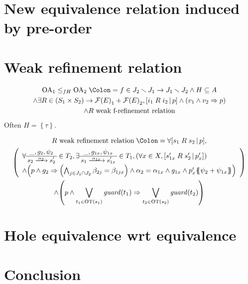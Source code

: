 \documentclass{article}
\theoremstyle{plain}
\theoremstyle{definition}
\newcommand\mpar[1]{{\left(#1\right)}}
\newcommand\mbrk[1]{{\left[#1\right]}}
\newcommand\mbrc[1]{{\left\{#1\right\}}}
\newcommand\psubst[1]{\mbrc{\!\!\mbrc{#1}\!\!}}
\newcommand\midbar{\,\middle|\,}
\newcommand\prel[4]{\mbrk{#2\mathrel{#1}#3\midbar #4}}
\newcommand\defnotation{\DOTSB\;{\Colon=}\;}
\newcommand\fformulas[1]{{\mathcal{F}\mpar{#1}}}
\newcommand\OT[6]{\text{\small\(%
	\setlength\arraycolsep{2pt}\everymath{\displaystyle}%
	\begin{array}{c}%
	#4,#5,#6 \\\hline
	#1\xrightarrow{\raisebox{-1.5pt}[.8\height][0pt]{\makebox[1.4\width]{\(\scriptstyle #3\)}}}#2
	\end{array}\)}}
\begin{document}
\section{New equivalence relation induced by pre-order}


\section{Weak refinement relation}
\begin{multline*}
	\mathrm{OA}_1 \leq_{fH} \mathrm{OA}_2 \defnotation f \in J_2 \setminus J_1 \to J_1 \setminus J_2 \wedge H \subseteq A \\
	\wedge \exists R \in \mpar{S_1 \times S_2} \to \fformulas{E}_1 + \fformulas{E}_2, \prel{R}{i_1}{i_2}{p} \wedge \mpar{v_1 \wedge v_2 \Rightarrow p} \\
	\wedge R \text{ weak f-refinement relation}
\end{multline*}
Often \(H = \mbrc{\tau}\).

\begin{multline*}
	R \text{ weak refinement relation} \defnotation \forall \prel{R}{s_1}{s_2}{p}, \\
	\mpar{\begin{array}{l}
		\forall \OT{s_2}{s'_2}{\alpha_2}{\_}{g_2}{\psi_2} \in T_2, \exists \OT{s_1}{s'_{1x}}{\alpha_{1x}}{\_}{g_{1x}}{\psi_{1x}} \in T_1, \mpar{\forall x \in X, \prel{R}{s'_{1x}}{s'_2}{p'_x}} \\
		\wedge \mpar{p \wedge g_2 \Rightarrow \mpar{\bigwedge_{j \in J_1 \cap J_2} \beta_{2j} = \beta_{1jx}} \wedge \alpha_2 = \alpha_{1x} \wedge g_{1x} \wedge p'_x\psubst{\psi_2 + \psi_{1x}}}
	\end{array}} \\
	\wedge \mpar{p \wedge \bigvee_{t_1 \in \mathrm{OT}\mpar{s_1}} \mathit{guard}\mpar{t_1} \Rightarrow \bigvee_{t_2 \in \mathrm{OT}\mpar{s_2}} \mathit{guard}\mpar{t_2}}
\end{multline*}


\section{Hole equivalence wrt equivalence}


\section{Conclusion}
\end{document}
